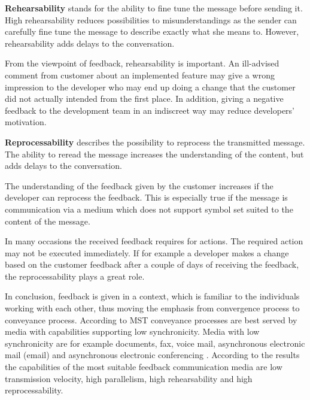 \documentclass[conference]{IEEEtran}
\begin{document}
\textbf{Rehearsability} stands for the ability to fine tune the message before sending it. High rehearsability reduces possibilities to misunderstandings as the sender can carefully fine tune the message to describe exactly what she means to. However, rehearsability adds delays to the conversation. \cite{2008dennis} 

From the viewpoint of feedback, rehearsability is important. An ill-advised comment from customer about an implemented feature may give a wrong impression to the developer who may end up doing a change that the customer did not actually intended from the first place. In addition, giving a negative feedback to the development team in an indiscreet way may reduce developers' motivation.

\textbf{Reprocessability} describes the possibility to reprocess the transmitted message. The ability to reread the message increases the understanding of the content, but adds delays to the conversation. \cite{2008dennis}

The understanding of the feedback given by the customer increases if the developer can reprocess the feedback. This is especially true if the message is communication via a medium which does not support symbol set suited to the content of the message. 

In many occasions the received feedback requires for actions. The required action may not be executed immediately. If for example a developer makes a change based on the customer feedback after a couple of days of receiving the feedback, the reprocessability plays a great role.

In conclusion, feedback is given in a context, which is familiar to the individuals working with each other, thus moving the emphasis from convergence process to conveyance process. According to MST conveyance processes are best served by media with capabilities supporting low synchronicity. Media with low synchronicity are for example documents, fax, voice mail, asynchronous electronic mail (email) and asynchronous electronic conferencing \cite{2008dennis}. According to the results the capabilities of the most suitable feedback communication media are low transmission velocity, high parallelism, high rehearsability and high reprocessability.
\end{document}
